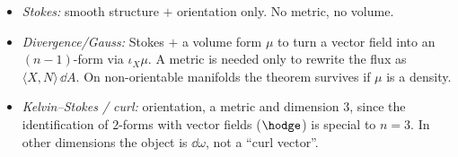 \begin{remark}\label{rem:whatneeds}
\begin{itemize}
\item \emph{Stokes:} smooth structure $+$ orientation only. No metric, no volume.
\item \emph{Divergence/Gauss:} Stokes $+$ a volume form $\mu$ to turn a vector field into an $(n-1)$-form via $\iota_X\mu$. A metric is needed only to rewrite the flux as $\langle X,N\rangle\,\dd A$. On non-orientable manifolds the theorem survives if $\mu$ is a density.
\item \emph{Kelvin--Stokes / curl:} orientation, a metric and dimension $3$, since the identification of $2$-forms with vector fields ($\hodge$) is special to $n=3$. In other dimensions the object is $\dd\omega$, not a ``curl vector''.
\end{itemize}
\end{remark}
